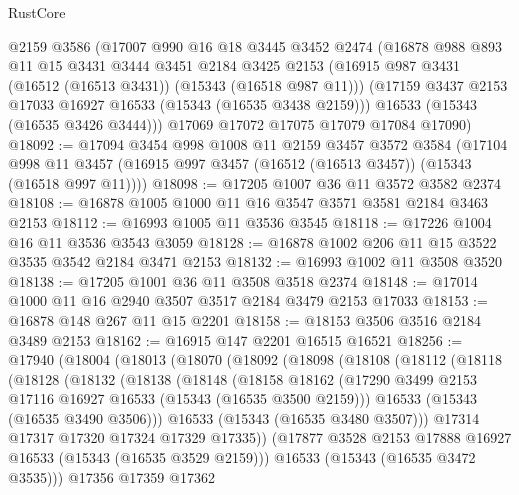 \begin{lexlean}{RustCore}
\begin{coremodule}
    @2159
    @3586
    (@17007
      @990
      @16
      @18
      @3445
      @3452
      @2474
      (@16878
        @988
        @893
        @11
        @15
        @3431
        @3444
        @3451
        @2184
        @3425
        @2153
        (@16915 @987 @3431 (@16512 (@16513 @3431)) (@15343 (@16518 @987 @11)))
        (@17159 @3437 @2153 @17033 @16927 @16533 (@15343 (@16535 @3438 @2159)))
        @16533
        (@15343 (@16535 @3426 @3444)))
      @17069
      @17072
      @17075
      @17079
      @17084
      @17090)
@18092 := @17094
    @3454
    @998
    @1008
    @11
    @2159
    @3457
    @3572
    @3584
    (@17104 @998 @11 @3457 (@16915 @997 @3457 (@16512 (@16513 @3457)) (@15343 (@16518 @997 @11))))
@18098 := @17205 @1007 @36 @11 @3572 @3582 @2374
@18108 := @16878 @1005 @1000 @11 @16 @3547 @3571 @3581 @2184 @3463 @2153
@18112 := @16993 @1005 @11 @3536 @3545
@18118 := @17226 @1004 @16 @11 @3536 @3543 @3059
@18128 := @16878 @1002 @206 @11 @15 @3522 @3535 @3542 @2184 @3471 @2153
@18132 := @16993 @1002 @11 @3508 @3520
@18138 := @17205 @1001 @36 @11 @3508 @3518 @2374
@18148 := @17014 @1000 @11 @16 @2940 @3507 @3517 @2184 @3479 @2153 @17033
@18153 := @16878 @148 @267 @11 @15 @2201
@18158 := @18153 @3506 @3516 @2184 @3489 @2153
@18162 := @16915 @147 @2201 @16515 @16521
@18256 := @17940
    (@18004
      (@18013
        (@18070
          (@18092
            (@18098
              (@18108
                (@18112
                  (@18118
                    (@18128
                      (@18132
                        (@18138
                          (@18148
                            (@18158
                              @18162
                              (@17290
                                @3499
                                @2153
                                @17116
                                @16927
                                @16533
                                (@15343 (@16535 @3500 @2159)))
                              @16533
                              (@15343 (@16535 @3490 @3506)))
                            @16533
                            (@15343 (@16535 @3480 @3507)))
                          @17314
                          @17317
                          @17320
                          @17324
                          @17329
                          @17335))
                      (@17877 @3528 @2153 @17888 @16927 @16533 (@15343 (@16535 @3529 @2159)))
                      @16533
                      (@15343 (@16535 @3472 @3535)))
                    @17356
                    @17359
                    @17362

\end{coremodule}
\end{lexlean}
